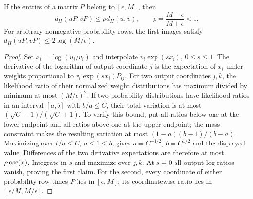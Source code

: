 \begin{lemma}\label{lem:v10-hilbert}
If the entries of a matrix $P$ belong to $[\epsilon,M]$, then
\[
 d_H(uP,vP)\le\rho d_H(u,v),\qquad
 \rho=\frac{M-\epsilon}{M+\epsilon}<1.
\]
For arbitrary nonnegative probability rows, the first images satisfy
$d_H(uP,vP)\le2\log(M/\epsilon)$.
\end{lemma}
\begin{proof}
Set $x_i=\log(u_i/v_i)$ and interpolate $v_i\exp(sx_i)$,
$0\le s\le1$. The derivative of the logarithm of output coordinate
$j$ is the expectation of $x_i$ under weights proportional to
$v_i\exp(sx_i)P_{ij}$. For two output coordinates $j,k$, the likelihood
ratio of their normalized weight distributions has maximum divided
by minimum at most $(M/\epsilon)^2$. If two probability distributions
have likelihood ratios in an interval $[a,b]$ with $b/a\le C$, their
total variation is at most $(\sqrt C-1)/(\sqrt C+1)$.
To verify this bound, put all ratios below one at the lower endpoint
and all ratios above one at the upper endpoint; the mass constraint
makes the resulting variation at most
$(1-a)(b-1)/(b-a)$. Maximizing over $b/a\le C$, $a\le1\le b$,
gives $a=C^{-1/2}$, $b=C^{1/2}$ and the displayed value.
Differences of the two derivative expectations are therefore at
most $\rho\operatorname{osc}(x)$. Integrate in $s$ and maximize over $j,k$.
At $s=0$ all output log ratios vanish, proving the first claim.
For the second, every coordinate of either probability row times
$P$ lies in $[\epsilon,M]$; its coordinatewise ratio lies in
$[\epsilon/M,M/\epsilon]$.
\end{proof}

